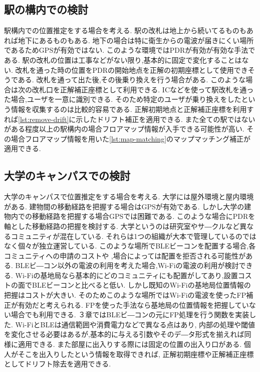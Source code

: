 \subsection{駅の構内での検討}
駅構内での位置推定をする場合を考える.
駅の改札は地上から続いてるものもあれば地下にあるものもある.     
地下の場合は特に衛生からの電波が届きにくい場所であるためGPSが有効ではない.
このような環境ではPDRが有効が有効な手法である.
駅の改札の位置は工事などがない限り,基本的に固定で変化することはない.
改札を通った時の位置をPDRの開始地点を正解の初期座標として使用できそうである.
改札を通って出た後,その後乗り換えを行う場合がある.
このような場合は次の改札口を正解補正座標として利用できる.
ICなどを使って駅改札を通った場合,ユーザを一意に識別できる.
そのため特定のユーザが乗り換えをしたという情報を収集するのは比較的容易である.
正解初期地点と正解補正座標を利用すれば\ref{lst:remove-drift}に示したドリフト補正を適用できる.
また全ての駅ではないがある程度以上の駅構内の場合フロアマップ情報が入手できる可能性が高い.
その場合フロアマップ情報を用いた\ref{lst:map-matching}のマップマッチング補正が適用できる.

\subsection{大学のキャンパスでの検討}
大学のキャンパスで位置推定をする場合を考える.
大学には屋外環境と屋内環境がある.
建物間の移動経路を把握する場合はGPSが有効である.
しかし大学の建物内での移動経路を把握する場合GPSでは困難である.
このような場合にPDRを軸とした移動経路の把握を検討する.
大学というのは研究室やサ―クルなど異なるコミュニティが混在している.
それらは1つの組織が大本で管理しているのではなく個々が独立運営している.
このような場所でBLEビーコンを配置する場合,各コミュニティへの申請のコストや
,場合によっては配置を拒否される可能性がある.
BLEビ―コン以外の電波の利用を考えた場合,Wi-Fiの電波の利用が検討できる.
Wi-Fiの基地局なら基本的にどのコミュニティにも配置がしてあり,設置コストの面でBLEビーコンと比べると低い.
しかし既知のWi-Fiの基地局位置情報の把握はコストが大きい.
そのためこのような場所ではWi-Fiの電波を使ったFP補正が有効だと考えられる.
FPを使った手法なら基地局の位置情報を把握していない場合でも利用できる.
３章ではBLEビ―コンの元にFP処理を行う関数を実装した.
Wi-FiとBLEは通信範囲や消費電力などで異なる点はあり, 
内部の処理や閾値を変化させる必要はあるが,基本的に与える引数やそのデ―タ形式を揃えれば同様に適用できる.
また部屋に出入りする際には固定の位置の出入り口がある.
個人がそこを出入りしたという情報を取得できれば,
正解初期座標や正解補正座標としてドリフト除去を適用できる.


